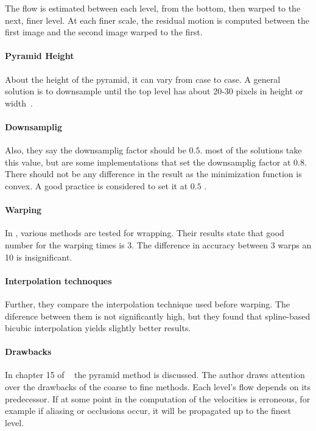 \documentclass[12pt,a4paper,twoside]{report}
\begin{document}
The flow is estimated between each level, from the bottom, then warped to the next, finer level. At each finer scale, the residual motion is computed between the first image and the second image warped to the first. 

\paragraph{Pyramid Height} \label{pyrHeight} About the height of the pyramid, it can vary from case to case. A general solution is to downsample until the top level has about 20-30 pixels in height or width~\cite{sun2010}. 

\paragraph{Downsamplig}Also, they say the downsamplig factor should be $0.5$. most of the solutions take this value, but are some implementations that set the downsamplig factor at $0.8$. There should not be any difference in the result as the minimization function is convex. A good practice is considered to set it at $0.5$ \cite{sun2010}.



\paragraph{Warping}In \cite{sun2010}, various methods are tested for wrapping. Their results state that good number for the warping times is 3. The difference in accuracy between 3 warps an 10 is insignificant.

\paragraph{Interpolation technoques} Further, they compare the interpolation technique used before warping.
The diference between them is not significantly high, but they found that spline-based bicubic interpolation yields slightly better results.

\paragraph{Drawbacks}In chapter 15 of ~\cite{fleet2006} the pyramid method is discussed. The author draws attention over the drawbacks of the coarse to fine methods. Each level's flow depends on its predecessor. If at some point in the computation of the velocities is erroneous, for example if aliasing or occlusions occur, it will be propagated up to the finest level.
 
\end{document}
